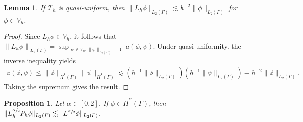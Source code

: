 \documentclass[numbers,webpdf]{ima-authoring-template}%
\theoremstyle{thmstyletwo}%
\newtheorem{proposition}[theorem]{Proposition}%
\newtheorem{lemma}{Lemma}%
\numberwithin{equation}{section}
\begin{document}
\begin{lemma}
    \label{lemma:boundwithhminus2}
    If $\mathcal{T}_h$ is quasi-uniform, then $\|L_h\phi\|_{L_2(\Gamma)}\lesssim h^{-2}\|\phi\|_{L_2(\Gamma)}$ for $\phi\in V_h$.
\end{lemma}
\begin{proof}
    Since $L_h \phi \in V_h$, it follows that  $\left\|L_h \phi\right\|_{L_2(\Gamma)}=\sup _{\substack{\psi \in V_h :\|\psi\|_{L_2(\Gamma)}=1}} a(\phi, \psi)$. Under quasi-uniformity, the inverse inequality yields
        \begin{align*}
            a(\phi, \psi) \leq\|\phi\|_{\dot{H}^1(\Gamma)}\|\psi\|_{\dot{H}^1(\Gamma)} \lesssim(h^{-1}\|\phi\|_{L_2(\Gamma)})(h^{-1}\|\psi\|_{L_2(\Gamma)})=h^{-2}\|\phi\|_{L_2(\Gamma)}.
        \end{align*}
        Taking the supremum gives the result.
        \hfill
\end{proof}
\begin{proposition}
\label{prop:controlofLhbyL}
        Let $\alpha\in[0,2]$. If $\phi\in\dot{H}^{\alpha}(\Gamma)$, then $\|L_h^{\sfrac{\alpha}{2}}P_h\phi\|_{L_2({\mit\varGamma})} \lesssim \|L^{\sfrac{\alpha}{2}}\phi\|_{L_2({\mit\varGamma})}$.
\end{proposition}
\end{document}
